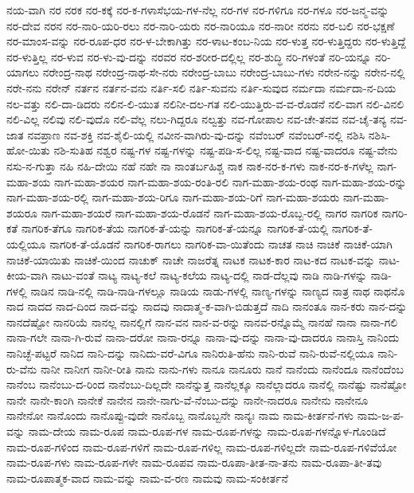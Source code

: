 {ನಯ-ವಾಗಿ
ನರ
ನರಕ
ನರ-ಕಕ್ಕೆ
ನರ-ಕ-ಗಳಾಸೆಭಯ-ಗಳ-ನೆಲ್ಲ
ನರ-ಗಳ
ನರ-ಗಳಿಗೂ
ನರ-ಗಳೂ
ನರ-ಜನ್ಮ-ವನ್ನು
ನರ-ದೇವ
ನರನ
ನರ-ನಾರಿ-ಯರಿ-ರಲು
ನರ-ನಾರಿ-ಯರು
ನರ-ನಾರಿಯೂ
ನರ-ನಾರೀ
ನರನು
ನರ-ಬಲಿ
ನರ-ಭಕ್ಷಣೆ
ನರ-ಮಾಂಸ-ವನ್ನು
ನರ-ರೂಪ-ಧರ
ನರ-ಳ-ಬೇಕಾಗಿತ್ತು
ನರ-ಳಾಟ-ಕಂಬ-ನಿಯ
ನರ-ಳುತ್ತ
ನರ-ಳುತ್ತಿದ್ದರು
ನರ-ಳುತ್ತಿದ್ದೆ
ನರ-ಳುತ್ತಿಲ್ಲ
ನರ-ಳುವ
ನರ-ಳು-ವು-ದನ್ನು
ನರವರ
ನರ-ಶರೀರ-ದಲ್ಲಿಲ್ಲ
ನರ-ಶುದ್ಧಿ
ನರಿ-ಗಳಂತೆ
ನರಿ-ಯನ್ನೂ
ನರಿ-ಯಾಗಲು
ನರೇಂದ್ರ-ನಾಥ
ನರೇಂದ್ರ-ನಾಥ-ಸೇ-ನರು
ನರೇಂದ್ರ-ಬಾಬು
ನರೇಂದ್ರ-ಬಾಬು-ಗಳು
ನರೇನ-ನನ್ನು
ನರೇನ-ನಲ್ಲಿ
ನರೇ-ನನು
ನರೇನ್
ನರ್ತನ
ನರ್ತನ-ವನು
ನರ್ತಿ-ಸಲಿ
ನರ್ತಿ-ಸುವನು
ನರ್ತಿ-ಸುವುದ
ನರ್ಮದಾ
ನರ್ಮದಾ-ನ-ದಿಯ
ನಲ-ವತ್ತು
ನಲಿ-ದಾ-ಡಿದರು
ನಲಿನ-ಲಿ-ಯುತ
ನಲಿನೀ-ದಲ-ಗತ
ನಲಿ-ಯುತ್ತಿರು-ವ-ವ-ರೊಡನೆ
ನಲಿ-ವಾಗ
ನಲಿ-ವಿನಲಿ
ನಲಿ-ವಿಲ್ಲ
ನಲಿವು
ನಲಿ-ವುದೊ
ನಲಿ-ವೆಲ್ಲ
ನಲು-ಗಿದ್ದರೂ
ನಲ್ವತ್ತು
ನವ-ಗೋಪಾಲ
ನವ-ಚೇ-ತನವ
ನವ-ಚೈ-ತನ್ಯ
ನವ-ಜಾತ
ನವಪ್ರಾಣ
ನವ-ಶಕ್ತಿ
ನವ-ಶೈಲಿ-ಯಲ್ಲಿ
ನವೀನ-ವಾಗಿರು-ವು-ದನ್ನು
ನವೆಂಬರ್
ನವೆಂಬರ್-ನಲ್ಲಿ
ನಶಿಸಿ
ನಶಿಸಿ-ಹೋ-ಯಿತು
ನಶಿ-ಸುತಿಹ
ನಶ್ವರ
ನಷ್ಟ-ಗಳ
ನಷ್ಟ-ಗಳನ್ನು
ನಷ್ಟ-ಪಡಿ-ಸ-ಲಿಲ್ಲ
ನಷ್ಟ-ವಾದ
ನಷ್ಟ-ವಾದರೂ
ನಷ್ಟ-ವೇನು
ನಸು-ನ-ಗುತ್ತಾ
ನಹಿ
ನಹಿ-ದೇಯಿ
ನಹೆ
ನಹೇ
ನಾ
ನಾಂತರ್ಬಹಿಶ್ಚ
ನಾಕ
ನಾಕ-ನರ-ಕ-ಗಳು
ನಾಕ-ನರ-ಕ-ಗಳೆಲ್ಲ
ನಾಗ-ಮಹಾ-ಶಯ
ನಾಗ-ಮಹಾ-ಶಯರ
ನಾಗ-ಮಹಾ-ಶಯ-ರಂತಿ-ರಲಿ
ನಾಗ-ಮಹಾ-ಶಯ-ರಂಥ
ನಾಗ-ಮಹಾ-ಶಯ-ರನ್ನು
ನಾಗ-ಮಹಾ-ಶಯ-ರಲ್ಲಿ
ನಾಗ-ಮಹಾ-ಶಯ-ರಿಗೂ
ನಾಗ-ಮಹಾ-ಶಯ-ರಿಗೆ
ನಾಗ-ಮಹಾ-ಶಯರು
ನಾಗ-ಮಹಾ-ಶಯರೂ
ನಾಗ-ಮಹಾ-ಶಯರೆ
ನಾಗ-ಮಹಾ-ಶಯ-ರೊಡನೆ
ನಾಗ-ಮಹಾ-ಶಯ-ರೊಬ್ಬ-ರಲ್ಲಿ
ನಾಗರ
ನಾಗರಿಕ
ನಾಗರಿ-ಕತೆ
ನಾಗರಿಕ-ತೆಗೂ
ನಾಗರಿಕ-ತೆಯ
ನಾಗರಿಕ-ತೆ-ಯನ್ನು
ನಾಗರಿಕ-ತೆ-ಯನ್ನೂ
ನಾಗರಿಕ-ತೆ-ಯಲ್ಲಿ
ನಾಗರಿಕ-ತೆ-ಯಲ್ಲಿಯೂ
ನಾಗರಿಕ-ತೆ-ಯೊಡನೆ
ನಾಗರಿಕ-ರಾಗಲು
ನಾಗರಿಕ-ವಾ-ಯಿತೆಂದು
ನಾಚತ
ನಾಚಿ
ನಾಚಿಕೆ
ನಾಚಿಕೆ-ಯಾಗಿ
ನಾಚಿಕೆ-ಯಾಯಿತು
ನಾಚಿಕೆ-ಯಿಂದ
ನಾಚುಕ್
ನಾಚೇ
ನಾಜರೆತ್ನ
ನಾಟಕ
ನಾಟಕ-ಕಾರ
ನಾಟ-ಕದ
ನಾಟಕ-ವನ್ನು
ನಾಟ-ಕೀಯ-ವಾಗಿ
ನಾಟು-ವಂತೆ
ನಾಟ್ಯ
ನಾಟ್ಯ-ಕಲೆ
ನಾಟ್ಯ-ಕಲೆಯ
ನಾಟ್ಯ-ದಲ್ಲಿ
ನಾಡ-ದೆಲ್ಲವು
ನಾಡಿ
ನಾಡಿ-ಗಳನ್ನು
ನಾಡಿ-ಗಳಲ್ಲಿ
ನಾಡಿನ
ನಾಡಿ-ನಲ್ಲಿ
ನಾಡಿ-ನಾಡಿ-ಗಳಲ್ಲೂ
ನಾಡಿಯ
ನಾಡು-ಗಳಲ್ಲಿ
ನಾಣ್ಯ-ಗಳನ್ನು
ನಾಣ್ಯದ
ನಾತ್ರ
ನಾಥ
ನಾಥನೊ
ನಾದ
ನಾದದ
ನಾದ-ದಿಂದ
ನಾದ-ವನ್ನು
ನಾದವು
ನಾದಾತ್ಮ-ಕ-ವಾಗಿ-ಬಿಡುತ್ತದೆ
ನಾದಿ
ನಾನಂತೂ
ನಾನ-ಕರು
ನಾನ-ದನ್ನು
ನಾನದೆಷ್ಟೋ
ನಾನರಿಯೆ
ನಾನಲ್ಲ
ನಾನಲ್ಲಿಗೆ
ನಾನ-ವನ
ನಾನ-ವ-ರನ್ನು
ನಾನವ-ರನ್ನೊಮ್ಮೆ
ನಾನಹೆ
ನಾನಾ
ನಾನಾ-ಗಲಿ
ನಾನಾ-ಗಲೇ
ನಾನಾ-ಗಿ-ರುವೆ
ನಾನಾ-ದರೋ
ನಾನಾ-ರನ್ನೂ
ನಾನಾ-ವು-ದನ್ನು
ನಾನಾ-ವು-ದಾದರೂ
ನಾನಾಸ್ತಿ
ನಾನಿಂದು
ನಾನಿಚ್ಛೆ-ಪಟ್ಟರೆ
ನಾನಿದ
ನಾನಿ-ದನ್ನು
ನಾನಿದು-ವರೆ-ವಿಗೂ
ನಾನಿರುತಿ-ಹೆನು
ನಾನಿ-ರುವೆ
ನಾನಿ-ರುವೆ-ನಲ್ಲಿಯೂ
ನಾನಿ-ರು-ವೆನು
ನಾನೀ
ನಾನೀಗ
ನಾನೀ-ರೀತಿ
ನಾನು
ನಾನು-ಗಳು
ನಾನೂ
ನಾನೂರು
ನಾನೆ
ನಾನೆಂದು
ನಾನೆಂದೂ
ನಾನೆಂದೆಂಬ
ನಾನೆಂಬ
ನಾನೆಂಬು-ದ-ರಿಂದ
ನಾನೆಂಬು-ದಿಲ್ಲದೇ
ನಾನೆನ್ನುತ್ತ
ನಾನೆಲ್ಲಕ್ಕೂ
ನಾನೆಲ್ಲಾದರೂ
ನಾನೆಲ್ಲಿ
ನಾನೆಷ್ಟು
ನಾನೆಷ್ಟೋ
ನಾನೇ
ನಾನೇ-ಕಾಂಗಿ
ನಾನೇಕೆ
ನಾನೇನ
ನಾನೇ-ನಾಗು-ವೆ-ನೆಂಬು-ದನ್ನು
ನಾನೇ-ನಾದರೂ
ನಾನೇನು
ನಾನೇನೂ
ನಾನೇನೋ
ನಾನೊಂದು
ನಾನೊಪ್ಪು-ವುದೇ
ನಾನೊಬ್ಬ
ನಾನೊಬ್ಬನೇ
ನಾನ್ಯಃ
ನಾಮ
ನಾಮ-ಕೀರ್ತನೆ-ಗಳು
ನಾಮ-ಜ-ಪ-ವನ್ನು
ನಾಮ-ದೇಯ
ನಾಮ-ರೂಪ
ನಾಮ-ರೂಪ-ಗಳ
ನಾಮ-ರೂಪ-ಗಳನ್ನು
ನಾಮ-ರೂಪ-ಗಳನ್ನೊಳ-ಗೊಂಡಿದೆ
ನಾಮ-ರೂಪ-ಗಳಿಂದ
ನಾಮ-ರೂಪ-ಗಳಿಗೆ
ನಾಮ-ರೂಪ-ಗಳಿಲ್ಲ
ನಾಮ-ರೂಪ-ಗಳಿಲ್ಲದೇ
ನಾಮ-ರೂಪ-ಗಳಿವೆಯೋ
ನಾಮ-ರೂಪ-ಗಳು
ನಾಮ-ರೂಪ-ಗಳೇ
ನಾಮ-ರೂಪವ
ನಾಮ-ರೂಪಾ-ತೀತ-ನಾ-ತನು
ನಾಮ-ರೂಪಾ-ತೀ-ತವು
ನಾಮ-ರೂಪಾತ್ಮಕ-ವಾದ
ನಾಮ-ವನ್ನು
ನಾಮ-ವ-ರಣ
ನಾಮವು
ನಾಮ-ಸಂಕೀರ್ತನೆ
}
